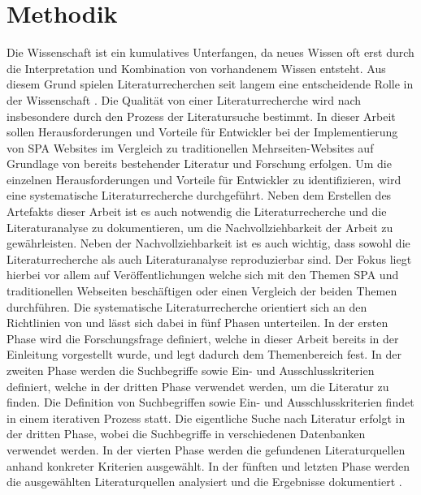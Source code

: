 \section{Methodik}
Die Wissenschaft ist ein kumulatives Unterfangen, da neues Wissen oft erst durch die Interpretation und Kombination von vorhandenem Wissen entsteht.
Aus diesem Grund spielen Literaturrecherchen seit langem eine entscheidende Rolle in der Wissenschaft \cite{conf/ecis/BrockeSNRPC09}.
Die Qualität von einer Literaturrecherche wird nach \citeauthor{conf/ecis/BrockeSNRPC09} insbesondere durch den Prozess der Literatursuche bestimmt.
In dieser Arbeit sollen Herausforderungen und Vorteile für Entwickler bei der Implementierung von \ac{SPA} Websites im Vergleich zu traditionellen Mehrseiten-Websites auf Grundlage von bereits bestehender Literatur und Forschung erfolgen.
Um die einzelnen Herausforderungen und Vorteile für Entwickler zu identifizieren, wird eine systematische Literaturrecherche durchgeführt.
Neben dem Erstellen des Artefakts dieser Arbeit ist es auch notwendig die Literaturrecherche und die Literaturanalyse zu dokumentieren, um die Nachvollziehbarkeit der Arbeit zu gewährleisten.
Neben der Nachvollziehbarkeit ist es auch wichtig, dass sowohl die Literaturrecherche als auch Literaturanalyse reproduzierbar sind.
Der Fokus liegt hierbei vor allem auf Veröffentlichungen welche sich mit den Themen \ac{SPA} und traditionellen Webseiten beschäftigen oder einen Vergleich der beiden Themen durchführen.
Die systematische Literaturrecherche orientiert sich an den Richtlinien von \citeauthor{conf/ecis/BrockeSNRPC09} und lässt sich dabei in fünf Phasen unterteilen.
In der ersten Phase wird die Forschungsfrage definiert, welche in dieser Arbeit bereits in der Einleitung vorgestellt wurde, und legt dadurch dem Themenbereich fest.
In der zweiten Phase werden die Suchbegriffe sowie Ein- und Ausschlusskriterien definiert, welche in der dritten Phase verwendet werden, um die Literatur zu finden.
Die Definition von Suchbegriffen sowie Ein- und Ausschlusskriterien findet in einem iterativen Prozess statt.
Die eigentliche Suche nach Literatur erfolgt in der dritten Phase, wobei die Suchbegriffe in verschiedenen Datenbanken verwendet werden.
In der vierten Phase werden die gefundenen Literaturquellen anhand konkreter Kriterien ausgewählt.
In der fünften und letzten Phase werden die ausgewählten Literaturquellen analysiert und die Ergebnisse dokumentiert \cite{conf/ecis/BrockeSNRPC09}.

